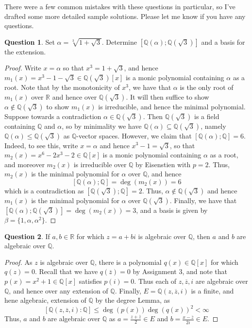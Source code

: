 \documentclass[11pt]{article}
\def\mbb{\mathbb}
\def\R{\mbb{R}}
\def\Q{\mbb{Q}}
\def\vs{\vspace{5mm}}
\renewcommand{\bar}{\overline}
\theoremstyle{pink}
\theoremstyle{boxedsolution}
\theoremstyle{definition}
\newtheorem{question}{Question}
\theoremstyle{claim}
\begin{document}
There were a few common mistakes with these questions in particular, so I've drafted some more detailed sample solutions. Please let me know if you have any questions.

\vs

\setcounter{question}{1}

\begin{question}
Set $\alpha = \sqrt[3]{1 + \sqrt{3}}$. Determine $[\Q(\alpha); \Q(\sqrt{3})]$ and a basis for the extension.
\end{question}

\begin{proof}
Write $x = \alpha$ so that $x^3 = 1 + \sqrt{3}$, and hence $m_1(x) = x^3 - 1 - \sqrt{3} \in \Q(\sqrt{3})[x]$ is a monic polynomial containing $\alpha$ as a root. Note that by the monotonicity of $x^3$, we have that $\alpha$ is the only root of $m_1(x)$ over $\R$ and hence over $\Q(\sqrt{3})$. It will then suffice to show $\alpha \notin \Q(\sqrt{3})$ to show $m_1(x)$ is irreducible, and hence the minimal polynomial. Suppose towards a contradiction $\alpha \in \Q(\sqrt{3})$. Then $\Q(\sqrt{3})$ is a field containing $\Q$ and $\alpha$, so by minimality we have $\Q(\alpha) \subseteq \Q(\sqrt{3})$, namely $\Q(\alpha) \leq \Q(\sqrt{3})$ as $\Q$-vector spaces. However, we claim that $[\Q(\alpha) ; \Q] = 6$. Indeed, to see this, write $x = \alpha$ and hence $x^3 - 1 = \sqrt{3}$, so that $m_2(x) = x^6 - 2x^3 - 2 \in \Q[x]$ is a monic polynomial containing $\alpha$ as a root, and moreover $m_2(x)$ is irreducible over $\Q$ by Eisenstien with $p=2$. Thus, $m_2(x)$ is the minimal polynomial for $\alpha$ over $\Q$, and hence 
\[
[\Q(\alpha); \Q] = \deg(m_2(x)) = 6
\]
which is a contradiction as $[\Q(\sqrt{3}); \Q] = 2$. Thus, $\alpha \notin \Q(\sqrt{3})$ and hence $m_1(x)$ is the minimal polynomial for $\alpha$ over $\Q(\sqrt{3})$. Finally, we have that $[\Q(\alpha); \Q(\sqrt{3})] = \deg(m_2(x)) = 3$, and a basis is given by $\beta = \{1, \alpha, \alpha^2\}$.
\end{proof}

\vs

\begin{question}
    If $a,b \in \R$ for which $z = a+bi$ is algebraic over $\Q$, then $a$ and $b$ are algebraic over $\Q$.
\end{question}

\begin{proof}
    As $z$ is algebraic over $\Q$, there is a polynomial $q(x) \in \Q[x]$ for which $q(z) = 0$. Recall that we  have $q(\bar{z}) = 0$ by Assignment 3, and note that $p(x) = x^2+1 \in \Q[x]$ satisfies $p(i) = 0$. Thus each of $z, \bar{z}, i$ are algebraic over $\Q$, and hence over any extension of $\Q$. Finally, $E = \Q(z, \bar{z}, i)$ is a finite, and hene algebraic, extension of $\Q$ by the degree Lemma, as 
    \[
    [\Q(z, \bar{z}, i): \Q] \leq \deg(p(x))\deg(q(x))^2 < \infty
    \]
    Thus, $a$ and $b$ are algebraic over $\Q$ as $a = \frac{z + \bar{z}}{2} \in E$ and $b = \frac{x - \bar{z}}{2i} \in E$.
\end{proof}
\end{document}
